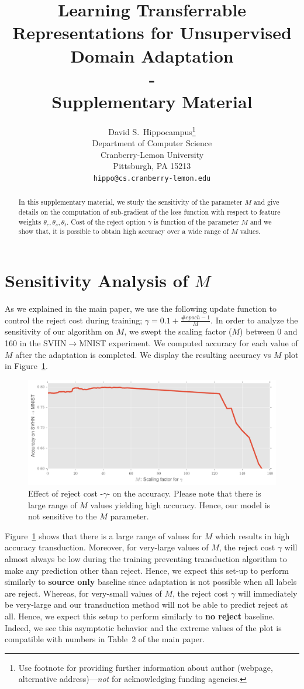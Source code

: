 \documentclass{article}
\title{Learning Transferrable Representations for Unsupervised Domain Adaptation \\ -  \\Supplementary Material}
\author{
  David S.~Hippocampus\thanks{Use footnote for providing further
    information about author (webpage, alternative
    address)---\emph{not} for acknowledging funding agencies.} \\
  Department of Computer Science\\
  Cranberry-Lemon University\\
  Pittsburgh, PA 15213 \\
  \texttt{hippo@cs.cranberry-lemon.edu} \\
}
\begin{document}
 

\maketitle

\begin{abstract} 
In this supplementary material, we study the sensitivity of the parameter $M$ and give details on the computation of sub-gradient of the loss function with respect to feature weights $\theta_c,\theta_s,\theta_t$. Cost of the reject option $\gamma$ is function of the parameter $M$ and we show that, it is possible to obtain high accuracy over a wide range of $M$ values.
\end{abstract} 

\section{Sensitivity Analysis of $M$}
As we explained in the main paper, we use the following update function to control the reject cost during training; $\gamma = 0.1 + \frac{\#epoch -1}{M}$. In order to analyze the sensitivity of our algorithm on $M$, we swept the scaling factor ($M$) between 0 and 160 in the SVHN$\rightarrow$MNIST experiment. We computed accuracy for each value of $M$ after the adaptation is completed. We display the resulting accuracy vs $M$ plot in Figure~\ref{sens}.



\begin{figure}[h]
\includegraphics[width=\textwidth]{a.pdf}
\caption{Effect of reject cost -$\gamma$- on the accuracy. Please note that there is large range of $M$ values yielding high accuracy. Hence, our model is not sensitive to the $M$ parameter.}
\label{sens}
\end{figure}

Figure~\ref{sens} shows that there is a large range of values for $M$ which results in high accuracy transduction. Moreover, for very-large values of $M$, the reject cost $\gamma$ will almost always be low during the training preventing transduction algorithm to make any prediction other than reject. Hence, we expect this set-up to perform similarly to \textbf{source only} baseline since adaptation is not possible when all labels are reject. Whereas, for very-small values of $M$, the reject cost $\gamma$ will immediately be very-large and our transduction method will not be able to predict reject at all. Hence, we expect this setup to perform similarly to \textbf{no reject} baseline. Indeed, we see this asymptotic behavior and the extreme values of the plot is compatible with numbers in Table~2 of the main paper.
\end{document}
